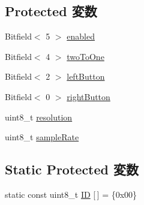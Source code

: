\subsection*{Protected 変数}
\begin{DoxyCompactItemize}
\item 
Bitfield$<$ 5 $>$ \hyperlink{classX86ISA_1_1PS2Mouse_a6e035794fee205f35fff611c97f74849}{enabled}
\item 
Bitfield$<$ 4 $>$ \hyperlink{classX86ISA_1_1PS2Mouse_ad672b278dde865a7b38ff03434e9a8ac}{twoToOne}
\item 
Bitfield$<$ 2 $>$ \hyperlink{classX86ISA_1_1PS2Mouse_aa3262d4baf4a5ae55d9a4c3696d27507}{leftButton}
\item 
Bitfield$<$ 0 $>$ \hyperlink{classX86ISA_1_1PS2Mouse_ad3b9d6ae9675e18b890099ea98665858}{rightButton}
\item 
uint8\_\-t \hyperlink{classX86ISA_1_1PS2Mouse_a2b8bdf2ccdee1cc9e95e8ec7714b68d2}{resolution}
\item 
uint8\_\-t \hyperlink{classX86ISA_1_1PS2Mouse_a5022f9261e83b503585507a1028d344e}{sampleRate}
\end{DoxyCompactItemize}
\subsection*{Static Protected 変数}
\begin{DoxyCompactItemize}
\item 
static const uint8\_\-t \hyperlink{classX86ISA_1_1PS2Mouse_aad1dea7ff5c01171f72700e686ae867e}{ID} \mbox{[}$\,$\mbox{]} = \{0x00\}
\end{DoxyCompactItemize}


